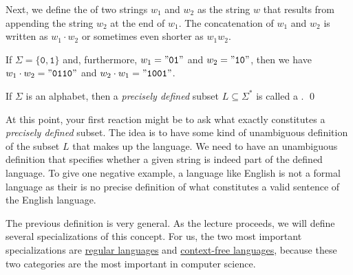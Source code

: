 Next, we define the   of two strings $w_1$ and $w_2$ as the string $w$ that
results from appending the string $w_2$ at the end of  $w_1$.  The concatenation of $w_1$ and $w_2$
is written as $w_1 \cdot w_2$ or sometimes even shorter as $w_1w_2$.  
\vspace*{0.3cm}

\exampleEng
If $\Sigma = \{\mathtt{0},\mathtt{1}\}$ and, furthermore,  $w_1 = \mathtt{\symbol{34}01\symbol{34}}$ and $w_2 = \mathtt{\symbol{34}10\symbol{34}}$, then we have
\\[0.2cm]
\hspace*{1.3cm}
$w_1 \cdot w_2 = \mathtt{\symbol{34}0110\symbol{34}}$ \quad and \quad $w_2 \cdot w_1 = \mathtt{\symbol{34}1001\symbol{34}}$.  \eox

\begin{Definition} \hspace*{\fill} \linebreak
If $\Sigma$ is an alphabet, then a \emph{precisely defined} subset $L \subseteq \Sigma^*$
is called a .  \qed
\end{Definition}

At this point, your first reaction might be to ask what exactly constitutes a \emph{precisely defined} subset.
The idea is to have some kind of unambiguous definition of the subset $L$ that makes up the language.  We need
to have an unambiguous definition that specifies whether a given string is indeed part of the defined language.
To give one negative example, a language like English is not a formal language as their is no precise
definition of what constitutes a valid sentence of the English language.

The previous definition is very general.  As the lecture proceeds, we will define several
specializations of this concept.  For us, the two most important specializations are 
\href{http://en.wikipedia.org/wiki/Regular_language}{regular languages}  and
\href{http://en.wikipedia.org/wiki/Context-free_language}{context-free languages}, 
because these two categories are the most important in computer science. 

